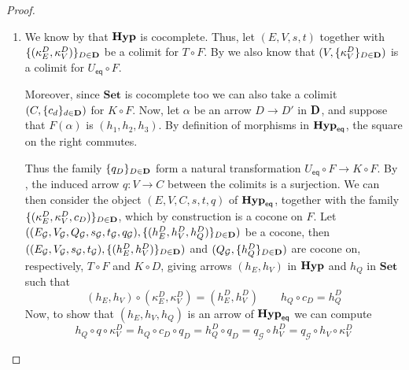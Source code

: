 \documentclass[3p]{elsarticle}
\newcommand{\eq}{\mathsf{eq}}
\newcommand{\Set}{\mathbf{Set}}
\def\D{\textbf {\textup{D}}}
\newcommand{\catname}[1]{\textbf{\textup{#1}}}
\newcommand{\hyp}{\catname{Hyp}}
\newcommand{\EqHyp}{\catname{Hyp}_{\mathsf{eq}}} %
\theoremstyle{remark}
\theoremstyle{definition}
\begin{document}
\noindent
\begin{minipage}[l]{.83\linewidth}
	\comp*
\end{minipage}\hfill
\begin{minipage}[r]{.15\linewidth}
\end{minipage} 
\begin{proof}\label{proof:comp}
	\begin{enumerate}
		\item We know by  that $\hyp$ is cocomplete. Thus, let $(E, V, s, t)$ together with $\{(\kappa_E^D, \kappa_V^D)\}_{D \in \D}$ be a colimit for $T \circ F$. By  we also know that $(V, \{\kappa^D_V\}_{D\in \D})$ is a colimit for $U_\eq\circ F$. 
		
		\noindent
		\begin{minipage}[l]{.8\linewidth}
			Moreover, since $\Set$ is cocomplete too we can also take a colimit $(C, \{c_d\}_{d\in \D})$ for $K\circ F$. Now,  let $\alpha$ be an arrow $D\to D'$ in $\D$, and suppose that $F(\alpha)$ is $(h_1, h_2, h_3)$. By definition of morphisms in $\EqHyp$, the square on the right commutes.
		\end{minipage}
		\hfill 
		\begin{minipage}[r]{.2\linewidth}
		\end{minipage}
		
		\smallskip 
		Thus the family $\{q_D\}_{D\in \D}$ form a natural transformation $U_\eq\circ F\to K\circ F$.  By , the induced arrow $q: V \to C$ between the colimits is a surjection.  We can then consider the object $(E, V, C, s, t, q)$ of $\EqHyp$, together with the family  $\{(\kappa_E^D, \kappa_V^D, c_D)\}_{D\in \D}$, which by construction is a cocone on $F$. Let $((E_\mathcal{G},V_\mathcal{G}, Q_{\mathcal{G}}, s_{\mathcal{G}}, t_{\mathcal{G}}, q_{\mathcal{G}}), \{(h^D_E, h^D_V, h^D_Q)\}_{D\in \D})$ be a cocone, then $((E_\mathcal{G},V_\mathcal{G}, s_{\mathcal{G}}, t_{\mathcal{G}}), \{(h^D_E, h^D_V)\}_{D\in \D})$ and $(Q_{\mathcal{G}}, \{h^D_Q\}_{D\in \D})$ are cocone on, respectively, $T\circ F$ and $K\circ D$, giving arrows $(h_E, h_V)$ in $\hyp$ and $h_Q$ in $\Set$ such that
		\[(h_E, h_V)\circ (\kappa_E^D, \kappa_V^D)=(h^D_E, h^D_V) \qquad h_Q\circ c_D=h^D_Q\]
		Now, to show that $(h_E, h_V, h_Q)$ is an arrow of $\EqHyp$ we can compute
		\[h_Q\circ q\circ \kappa^D_V=h_Q\circ c_D\circ q_D=h^D_Q\circ q_D=q_{\mathcal{G}} \circ h^D_V=q_{\mathcal{G}}\circ h_V\circ \kappa^D_V \]
		

\end{enumerate}
\end{proof}
\end{document}
